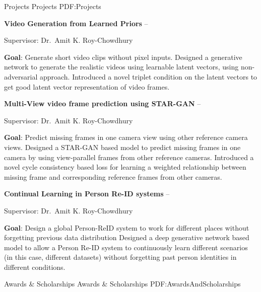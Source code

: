 \documentclass[letterpaper,MMMyyyy,nonstopmode]{simpleresumecv}
\begin{document}
\begin{Body}
\endgroup

\Section
{Projects}
{Projects}
{PDF:Projects}

\Entry
{\textbf{Video Generation from Learned Priors}}
\hfill
{} --
\begin{Detail}
\SubBulletItem
Supervisor:
Dr.~Amit K. Roy-Chowdhury   
\end{Detail}
\Gap
\BulletItem \textbf{Goal}: Generate short video clips without pixel inputs.
\BulletItem Designed a generative network to generate the realistic videos using learnable latent vectors, using non-adversarial approach.
\BulletItem Introduced a novel triplet condition on the latent vectors to get good latent vector representation of video frames.

\BigGap
\Entry
{\textbf{Multi-View video frame prediction using STAR-GAN}}
\hfill
{} --
\begin{Detail}
\SubBulletItem
Supervisor:
Dr.~Amit K. Roy-Chowdhury   
\end{Detail}
\Gap
\BulletItem \textbf{Goal}: Predict missing frames in one camera view using other reference camera views. 
\BulletItem Designed a STAR-GAN based model to predict missing frames in one camera by using view-parallel frames from other reference cameras. 
\BulletItem Introduced a novel cycle consistency based loss for learning a weighted relationship between missing frame and corresponding reference frames from other cameras. 

\BigGap
\Entry
{\textbf{Continual Learning in Person Re-ID systems}}
\hfill
{} --
\begin{Detail}
\SubBulletItem
Supervisor:
Dr.~Amit K. Roy-Chowdhury   
\end{Detail}
\Gap
\BulletItem \textbf{Goal}: Design a global Person-ReID system to work for different places without forgetting previous data distribution   
\BulletItem Designed a deep generative network based model to allow a Person Re-ID system to continuously learn different scenarios (in this case, different datasets) without forgetting past person identities in different conditions.


\Section
{Awards \&\newline
Scholarships}
{Awards \& Scholarships}
{PDF:AwardsAndScholarships}


\end{Body}
\end{document}
